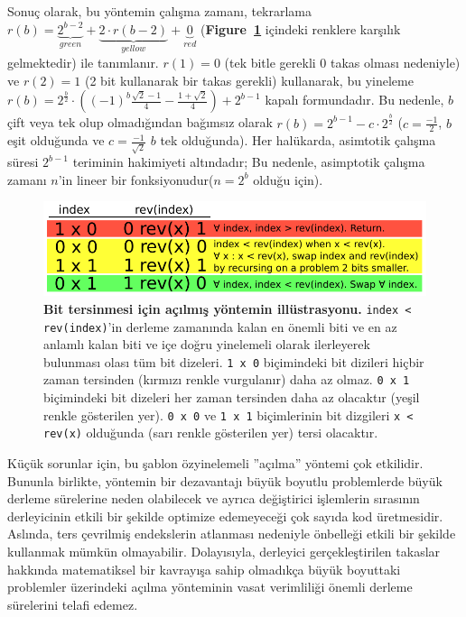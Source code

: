 \documentclass[10pt]{article}
\begin{document}
Sonu\c{c} olarak, bu y\"{o}ntemin \c{c}al{\i}\c{s}ma zaman{\i}, tekrarlama 
$r(b) = \underbrace{2^{b-2}}_{green} + \underbrace{2 \cdot   r(b-2)}_{yellow} + \underbrace{0}_{red}$ 
({\bf Figure~\ref{figure:unrolled}} i\c{c}indeki renklere kar\c{s}{\i}l{\i}k gelmektedir) ile tan{\i}mlan{\i}r.
$r(1) = 0$ (tek bitle gerekli 0 takas olmas{\i} nedeniyle) ve $r(2) = 1$ (2 bit 
kullanarak bir takas gerekli) kullanarak, bu yineleme $r(b) = 2^{\frac{b}{2}} 
\cdot \left( {(-1)}^b \frac{\sqrt{2}-1}{4} - \frac{1 + \sqrt{2}}{4} \right) + 2^{b-1}$
kapal{\i} formundad{\i}r. Bu nedenle, $b$ \c{c}ift veya tek olup olmad{\i}\u{g}{\i}ndan ba\u{g}{\i}ms{\i}z olarak
$r(b) = 2^{b-1} - c \cdot 2^{\frac{b}{2}}$ ($c=\frac{-1}{2}$, $b$ e\c{s}it oldu\u{g}unda
ve $c=\frac{-1}{\sqrt{2}}$ $b$ tek oldu\u{g}unda). Her hal\"{u}karda, asimtotik \c{c}al{\i}\c{s}ma s\"{u}resi
$2^{b-1}$ teriminin hakimiyeti alt{\i}ndad{\i}r; Bu nedenle, asimptotik \c{c}al{\i}\c{s}ma 
zaman{\i} $n$'in lineer bir fonksiyonudur($n = 2^b$ oldu\u{g}u i\c{c}in).

\begin{figure}
\centering
\includegraphics[width=4.5in]{cartoons/unrolled.pdf}
\caption{{\bf Bit tersinmesi i\c{c}in a\c{c}{\i}lm{\i}\c{s} y\"{o}ntemin ill\"{u}strasyonu.}
{\tt index < rev(index)}'in derleme zaman{\i}nda kalan en \"{o}nemli biti ve en az
anlaml{\i} kalan biti ve i\c{c}e do\u{g}ru yinelemeli olarak ilerleyerek bulunmas{\i} olas{\i} 
t\"{u}m bit dizeleri. {\tt 1~x~0} bi\c{c}imindeki bit dizileri hi\c{c}bir zaman tersinden
(k{\i}rm{\i}z{\i} renkle vurgulan{\i}r) daha az olmaz. {\tt 0~x~1} bi\c{c}imindeki bit dizeleri
her zaman tersinden daha az olacakt{\i}r (ye\c{s}il renkle g\"{o}sterilen yer). 
{\tt 0~x~0} ve {\tt 1~x~1} bi\c{c}imlerinin bit dizgileri {\tt x < rev(x)} 
oldu\u{g}unda (sar{\i} renkle g\"{o}sterilen yer) tersi olacakt{\i}r.
  \label{figure:unrolled}}
\end{figure}

K\"{u}\c{c}\"{u}k sorunlar i\c{c}in, bu \c{s}ablon \"{o}zyinelemeli ''a\c{c}{\i}lma'' y\"{o}ntemi \c{c}ok etkilidir.
Bununla birlikte, y\"{o}ntemin bir dezavantaj{\i} b\"{u}y\"{u}k boyutlu problemlerde b\"{u}y\"{u}k 
derleme s\"{u}relerine neden olabilecek ve ayr{\i}ca de\u{g}i\c{s}tirici i\c{s}lemlerin s{\i}ras{\i}n{\i}n
derleyicinin etkili bir \c{s}ekilde optimize edemeyece\u{g}i \c{c}ok say{\i}da kod \"{u}retmesidir.
Asl{\i}nda, ters \c{c}evrilmi\c{s} endekslerin atlanmas{\i} nedeniyle \"{o}nbelle\u{g}i etkili bir 
\c{s}ekilde kullanmak m\"{u}mk\"{u}n olmayabilir. Dolay{\i}s{\i}yla, derleyici ger\c{c}ekle\c{s}tirilen 
takaslar hakk{\i}nda matematiksel bir kavray{\i}\c{s}a sahip olmad{\i}k\c{c}a b\"{u}y\"{u}k boyuttaki problemler 
\"{u}zerindeki a\c{c}{\i}lma y\"{o}nteminin vasat verimlili\u{g}i \"{o}nemli derleme s\"{u}relerini telafi edemez.
\end{document}
